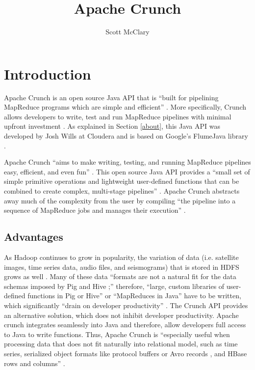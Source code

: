 \documentclass[9pt,twocolumn,twoside]{../../styles/osajnl}
\title{Apache Crunch}
\author[1,*]{Scott McClary}
\affil[1]{School of Informatics and Computing, Bloomington, IN 47408, U.S.A.}
\affil[*]{Corresponding authors: scmcclar@indiana.edu}
\begin{document}
\maketitle
{}
\section{Introduction} \label{introduction}
Apache Crunch is an open source Java API that is ``built for pipelining MapReduce \CE programs which are simple and efficient'' \cite{www-hadoop-ecosystem}. More specifically, Crunch allows developers to write, test and run MapReduce pipelines with minimal upfront investment \cite{www-hadoop-ecosystem}.
As explained in Section \ref{about},
this Java API was developed by Josh Wills at Cloudera \CE and is based on Google's FlumeJava library \cite{FlumeJava-paper-2012, www-crunch-about}.

Apache Crunch ``aims to make writing, testing, and running MapReduce pipelines easy, efficient, and even fun'' \cite{www-wills-crunch}. This open source Java API provides a ``small set of simple primitive operations and lightweight user-defined functions that can be combined to create complex, multi-stage pipelines'' \cite{www-wills-crunch}. Apache Crunch abstracts away much of the complexity from the user by compiling ``the pipeline into a sequence of MapReduce jobs and manages their execution'' \cite{www-wills-crunch}.
\subsection{Advantages}
As Hadoop continues to grow in popularity, the variation of data (i.e. satellite images, time series data, audio files, and seismograms) that is stored in HDFS \CE grows as well \cite{www-wills-crunch}. Many of these data ``formats are not a natural fit for the data schemas imposed by Pig \CE and Hive \CE;'' therefore, ``large, custom libraries of user-defined functions in Pig or Hive'' or ``MapReduces in Java'' have to be written, which significantly ``drain on developer productivity'' \cite{www-wills-crunch}. The Crunch API provides an alternative solution, which does not inhibit developer productivity. Apache crunch integrates seamlessly into Java and therefore, allow developers full access to Java to write functions. Thus, Apache Crunch is ``especially useful when processing data that does not fit naturally into relational model, such as time series, serialized object formats like protocol buffers or Avro records \CE , and HBase \CE rows and columns'' \cite{www-crunch-api}.
\end{document}
